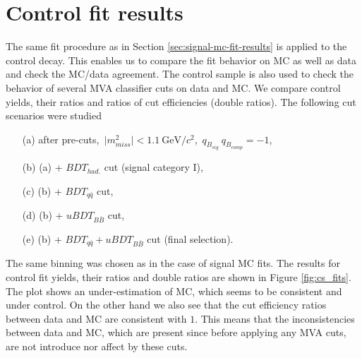 \documentclass[headings=standardclasses,headings=big,oneside,a4paper,openany,12pt]{scrbook}
\newcommand {\e}[1]{\mathrm{~#1}}
\begin{document}
\section{Control fit results}

The same fit procedure as in Section \ref{sec:signal-mc-fit-results} is applied to the control decay. This enables us to compare the fit behavior on MC as well as data and check the MC/data agreement. The control sample is also used to check the behavior of several MVA classifier cuts on data and MC. We compare control yields, their ratios and ratios of cut efficiencies (double ratios). The following cut scenarios were studied
\begin{itemize}
\item[(a)]  after pre-cuts,\, $\vert m_{miss}^2 \vert < 1.1\e{GeV}/c^2$,\, $q_{B_{sig}}~q_{B_{comp}} = -1$,
\item[(b)] (a) + $BDT_{had.}$ cut (signal category I),
\item[(c)] (b) + $BDT_{q\bar q}$ cut,
\item[(d)] (b) + $uBDT_{B\bar B}$ cut,
\item[(e)] (b) + $BDT_{q\bar q} + uBDT_{B\bar B}$ cut (final selection).
\end{itemize}

The same binning was chosen as in the case of signal MC fits. The results for control fit yields, their ratios and double ratios are shown in Figure \ref{fig:cs_fits}. The plot shows an under-estimation of MC, which seems to be consistent and under control. On the other hand we also see that the cut efficiency ratios between data and MC are consistent with $1$. This means that the inconsistencies between data and MC, which are present since before applying any MVA cuts, are not introduce nor affect by these cuts.
\end{document}
